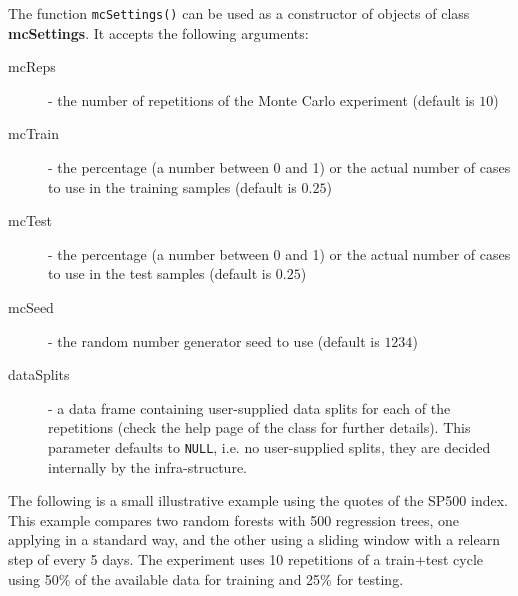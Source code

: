 \documentclass[10pt,a4paper]{article}\usepackage[]{graphicx}\usepackage[]{color}
\begin{document}
The function \texttt{mcSettings()} can be used as a constructor of
objects of class \textbf{mcSettings}. It accepts the following
arguments:

\begin{description}
\item[mcReps] - the number of repetitions of the Monte Carlo experiment (default is $10$)
\item[mcTrain] - the percentage (a number between 0 and 1) or the actual number of cases to use in the training samples (default is $0.25$)
\item[mcTest] - the percentage (a number between 0 and 1) or the actual  number of cases to use in the test samples (default is $0.25$)
\item[mcSeed] - the random number generator seed to use (default is $1234$)
\item[dataSplits] - a data frame containing user-supplied data splits
  for each of the repetitions (check the help page of the
  class for further details). This parameter defaults to
  \texttt{NULL}, i.e. no user-supplied splits, they are decided
  internally by the infra-structure.
\end{description}

The following is a small illustrative example using the quotes of the
SP500 index. This example compares two random forests with 500
regression trees, one applying in a standard way, and the other using
a sliding window with a relearn step of every 5 days. The experiment
uses 10 repetitions of a train+test cycle using 50\% of the available
data for training and 25\% for testing.
\end{document}
